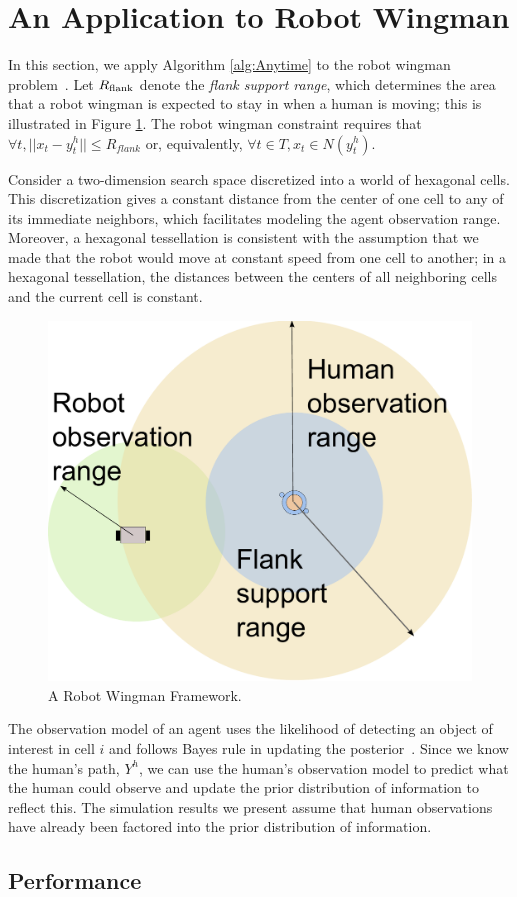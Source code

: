 \section{An Application to Robot Wingman}
\label{sec:wingman}

In this section, we apply Algorithm \ref{alg:Anytime} to the robot wingman problem~\cite{goodrich2013toward}.
Let $R_{\rm flank}$ denote the {\em flank support range}, which determines the area that a robot wingman is expected to stay in when a human is moving; this is illustrated in Figure \ref{fig:Wingman}.
The robot wingman constraint requires that $ \forall t, || x_{t} - y^{h}_{t} || \leq R_{flank} $ or, equivalently, 
$ \forall t \in T,  x_{t} \in N( y^{h}_{t} ) $.

Consider a two-dimension search space discretized into a world of hexagonal cells.
This discretization gives a constant distance from the center of one cell to any of its immediate neighbors, which facilitates modeling the agent observation range.
Moreover, a hexagonal tessellation is consistent with the assumption that we made that the robot would move at constant speed from one cell to another; in a hexagonal tessellation, the distances between the centers of all neighboring cells and the current cell is constant.

\begin{figure}
\centering
\includegraphics[width=0.35\linewidth]{./images/Wingman.pdf}
\caption{A Robot Wingman Framework.}
\label{fig:Wingman}
\end{figure}

The observation model of an agent uses the likelihood of detecting an object of interest in cell $ i $ and follows Bayes rule in updating the posterior~\cite{goodrich2013toward}.
Since we know the human's path, $ Y^{h} $, we can use the human's observation model to predict what the human could observe and update the prior distribution of information to reflect this.
The simulation results we present assume that human observations have already been factored into the prior distribution of information.

\subsection{Performance}

